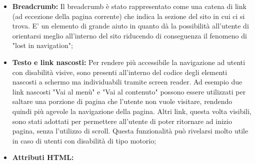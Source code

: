 \begin{itemize}
	\item \textbf{Breadcrumb:} Il breadcrumb è stato rappresentato come una catena di link (ad eccezione della pagina corrente) che indica la sezione del sito in cui ci si trova. E' un elemento di grande aiuto in quanto dà la possibilità all'utente di orientarsi meglio all'interno del sito riducendo di conseguenza il fenomeno di "lost in navigation";
	\item \textbf{Testo e link nascosti:} Per rendere più accessibile la navigazione ad utenti con disabilità visive, sono presenti all'interno del codice degli elementi nascosti a schermo ma individuabili tramite screen reader. Ad esempio due link nascosti "Vai al menù" e "Vai al contenuto" possono essere utilizzati per saltare una porzione di pagina che l'utente non vuole visitare, rendendo quindi più agevole la navigazione della pagina. Altri link, questa volta visibili, sono stati adottati per permettere all'utente di poter ritornare ad inizio pagina, senza l'utilizzo di scroll. Questa funzionalità può rivelarsi molto utile in caso di utenti con disabilità di tipo motorio;
	\item \textbf{Attributi HTML:} 
\end{itemize}

